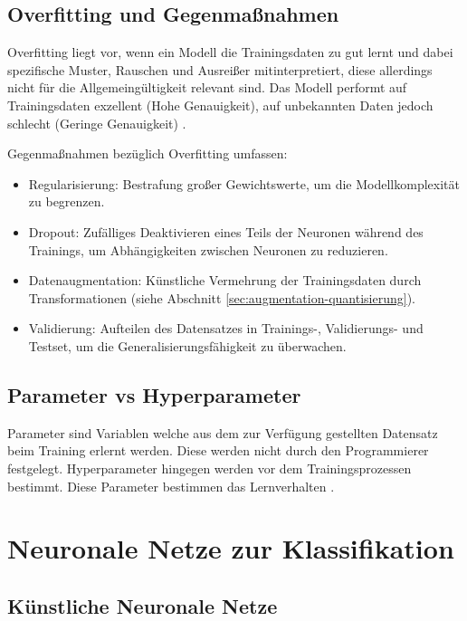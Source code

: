\subsection{Overfitting und Gegenmaßnahmen}\label{sub:overfitting}

Overfitting liegt vor, wenn ein Modell die Trainingsdaten zu gut lernt und dabei spezifische Muster, Rauschen und Ausreißer mitinterpretiert, diese allerdings nicht für die Allgemeingültigkeit relevant sind. Das Modell performt auf Trainingsdaten exzellent (Hohe Genauigkeit), auf unbekannten Daten jedoch schlecht (Geringe Genauigkeit) \cite{yingOverviewOverfittingIts2019}.

Gegenmaßnahmen bezüglich Overfitting umfassen:

\begin{itemize}
    \item Regularisierung: Bestrafung großer Gewichtswerte, um die Modellkomplexität zu begrenzen.
    \item Dropout: Zufälliges Deaktivieren eines Teils der Neuronen während des Trainings, um Abhängigkeiten zwischen Neuronen zu reduzieren.
    \item Datenaugmentation: Künstliche Vermehrung der Trainingsdaten durch Transformationen (siehe Abschnitt \ref{sec:augmentation-quantisierung}).
    \item Validierung: Aufteilen des Datensatzes in Trainings-, Validierungs- und Testset, um die Generalisierungsfähigkeit zu überwachen.
\end{itemize}

\subsection{Parameter vs Hyperparameter}\label{sub:parameter-hyperparameter}

Parameter sind Variablen welche aus dem zur Verfügung gestellten Datensatz beim Training erlernt werden. Diese werden nicht durch den Programmierer festgelegt. Hyperparameter hingegen werden vor dem Trainingsprozessen bestimmt. Diese Parameter bestimmen das Lernverhalten \cite[Kap. ~2.6]{burkovMachineLearningKompakt2019}.

\section{Neuronale Netze zur Klassifikation}\label{sec:neuronale-netze}
\subsection{Künstliche Neuronale Netze}\label{sub:knn}

